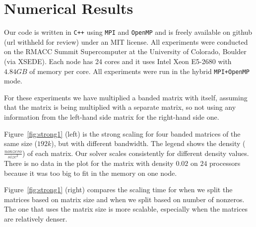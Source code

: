 \section{Numerical Results}
\label{sec:results}

Our code is written in \texttt{C++} using \texttt{MPI} and \texttt{OpenMP} and is freely available on github (url withheld for review) under an MIT license. 
All experiments were conducted on the RMACC Summit Supercomputer at the University of Colorado, Boulder (via XSEDE). Each node has 24 cores and it uses Intel Xeon E5-2680 with $4.84GB$ of memory per core. All experiments were run in the hybrid \texttt{MPI+OpenMP} mode. 


For these experiments we have multiplied a banded matrix with itself, assuming that the matrix is being multiplied with a separate matrix, so not using any information from the left-hand side matrix for the right-hand side one.

Figure~\ref{fig:strong1} (left) is the strong scaling for four banded matrices of the same size ($192k$), but with different bandwidth. The legend shows the density ($\frac{nonzero}{size^2}$) of each matrix. Our solver scales consistently for different density values. There is no data in the plot for the matrix with density $0.02$ on $24$ processors because it was too big to fit in the memory on one node.

Figure~\ref{fig:strong1} (right) compares the scaling time for when we split the matrices based on matrix size and when we split based on number of nonzeros. The one that uses the matrix size is more scalable, especially when the matrices are relatively denser.

